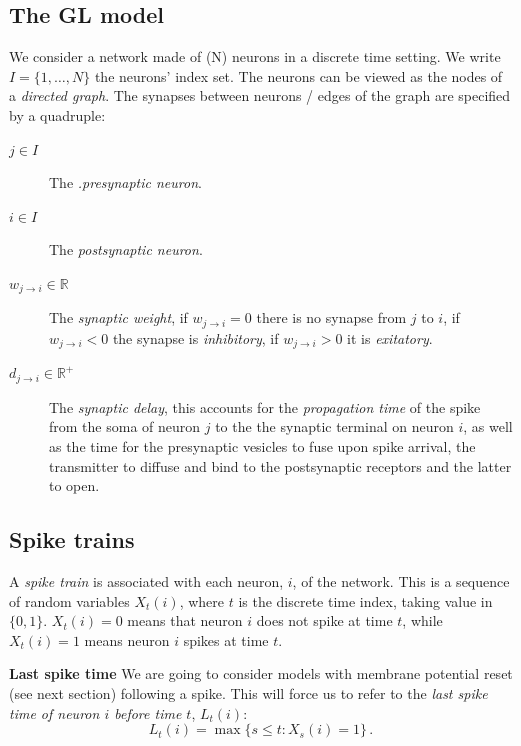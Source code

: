 \documentclass[11pt]{scrartcl}
\begin{document}
\subsection{The GL model}
\label{sec:org2652c4d}
\label{org98b0484}

We consider a network made of (N) neurons in a discrete time setting. We write \(I = \{1,\ldots,N\}\) the neurons' index set. The neurons can be viewed as the nodes of a \emph{directed graph}. The synapses between neurons / edges of the graph are specified by a quadruple:
\begin{description}
\item[{\(j \in I\)}] The \emph{.presynaptic neuron}.
\item[{\(i \in I\)}] The \emph{postsynaptic neuron}.
\item[{\(w_{j\rightarrow i} \in \mathbb{R}\)}] The \emph{synaptic weight}, if \(w_{j\rightarrow i} = 0\) there is no synapse from \(j\) to \(i\), if \(w_{j\rightarrow i} < 0\) the synapse is \emph{inhibitory}, if \(w_{j\rightarrow i} >0\) it is \emph{exitatory}.
\item[{\(d_{j\rightarrow i} \in \mathbb{R}^+\)}] The \emph{synaptic delay}, this accounts for the \emph{propagation time} of the spike from the soma of neuron \(j\) to the the synaptic terminal on neuron \(i\), as well as the time for the presynaptic vesicles to fuse upon spike arrival, the transmitter to diffuse and bind to the postsynaptic receptors and the latter to open.
\end{description}

\subsection{Spike trains}
\label{sec:org976a227}
A \emph{spike train} is associated with each neuron, \(i\), of the network. This is a sequence of random variables \(X_t(i)\), where \(t\) is the discrete time index, taking value in \(\{0,1\}\). \(X_t(i) = 0\) means that neuron \(i\) does not spike at time \(t\), while \(X_t(i) = 1\) means neuron \(i\) spikes at time \(t\). 

\textbf{Last spike time} We are going to consider models with membrane potential reset (see next section) following a spike. This will force us to refer to the \emph{last spike time of neuron \(i\) before time \(t\)}, \(L_t (i)\):
\begin{equation}\label{eq:last-spike-time}
L_t (i) = \max \{ s \le  t  : X_s (i) = 1  \} \,.
\end{equation}  
\end{document}
